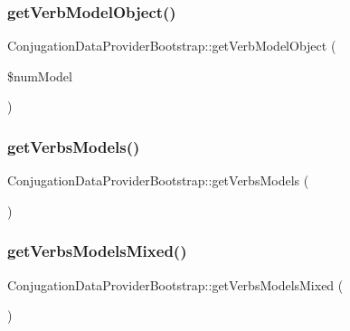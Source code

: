 \hypertarget{class_conjugation_data_provider_bootstrap_aec176c34c434c97c34aec9c8b3d058cc}{}\label{class_conjugation_data_provider_bootstrap_aec176c34c434c97c34aec9c8b3d058cc} 
\subsubsection{\texorpdfstring{get\+Verb\+Model\+Object()}{getVerbModelObject()}}
{\footnotesize\ttfamily Conjugation\+Data\+Provider\+Bootstrap\+::get\+Verb\+Model\+Object (\begin{DoxyParamCaption}\item[{}]{\$num\+Model }\end{DoxyParamCaption})}

\hypertarget{class_conjugation_data_provider_bootstrap_acd7282af2e4ac1b602656944b0459b97}{}\label{class_conjugation_data_provider_bootstrap_acd7282af2e4ac1b602656944b0459b97} 
\subsubsection{\texorpdfstring{get\+Verbs\+Models()}{getVerbsModels()}}
{\footnotesize\ttfamily Conjugation\+Data\+Provider\+Bootstrap\+::get\+Verbs\+Models (\begin{DoxyParamCaption}{ }\end{DoxyParamCaption})}

\hypertarget{class_conjugation_data_provider_bootstrap_a059e76472fb3972ebeeaa4060e9c22cf}{}\label{class_conjugation_data_provider_bootstrap_a059e76472fb3972ebeeaa4060e9c22cf} 
\subsubsection{\texorpdfstring{get\+Verbs\+Models\+Mixed()}{getVerbsModelsMixed()}}
{\footnotesize\ttfamily Conjugation\+Data\+Provider\+Bootstrap\+::get\+Verbs\+Models\+Mixed (\begin{DoxyParamCaption}{ }\end{DoxyParamCaption})}

